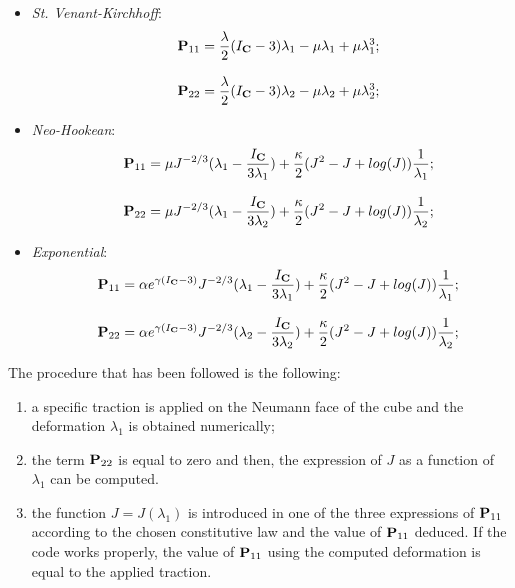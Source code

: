\begin{itemize}
\item \textit{St. Venant-Kirchhoff}:
  \begin{equation}
    \begin{array}{lll} & \textbf{P}_{11}=\displaystyle
      \frac{\lambda}{2}(I_{\textbf{C}}-3)\lambda_1 - \mu\lambda_1 +
      \mu\lambda_1^3;\\ \\ & \textbf{P}_{22}=\displaystyle
      \frac{\lambda}{2}(I_{\textbf{C}}-3)\lambda_2 - \mu\lambda_2 + \mu\lambda_2^3;
    \end{array}
    \label{eq::P11SVK}
  \end{equation}
\item \textit{Neo-Hookean}:
  \begin{equation}
    \begin{array}{lll} & \textbf{P}_{11}=\displaystyle \mu J^{-2/3}
      (\lambda_1 - \frac{I_{\textbf{C}}}{3\lambda_1}) + \frac{\kappa}{2}(J^2 - J +
      log(J))\frac{1}{\lambda_1};\\ \\ & \textbf{P}_{22}=\displaystyle \mu
      J^{-2/3} (\lambda_1 - \frac{I_{\textbf{C}}}{3\lambda_2}) +
      \frac{\kappa}{2}(J^2 - J + log(J))\frac{1}{\lambda_2};
    \end{array}
    \label{eq::P11NH}
  \end{equation}
\item \textit{Exponential}:
  \begin{equation}
    \begin{array}{lll} & \textbf{P}_{11}=\displaystyle \alpha e^{\gamma\left(I_{\textbf{C}}-3\right)}
      J^{-2/3}(\lambda_1 - \frac{I_{\textbf{C}}}{3\lambda_1})+\frac{\kappa}{2}(J^2 -
      J + log(J))\frac{1}{\lambda_1};\\ \\ & \textbf{P}_{22}=\displaystyle
      \alpha e^{\gamma\left(I_{\textbf{C}}-3\right)} J^{-2/3}(\lambda_2 -
      \frac{I_{\textbf{C}}}{3\lambda_2})+\frac{\kappa}{2}(J^2 - J +
      log(J))\frac{1}{\lambda_2};
    \end{array}
    \label{eq::P11EXP}
  \end{equation}
\end{itemize}
The procedure that has been followed is the following:
\begin{enumerate}
\item a specific traction is applied on the Neumann face of the cube
  and the deformation $\lambda_1$ is obtained numerically;
\item the term $\textbf{P}_{22}$ is equal to zero and then, the
  expression of $J$ as a function of $\lambda_1$ can be computed.
\item the function $J=J(\lambda_1)$ is introduced in one of the
  three expressions of $\textbf{P}_{11}$ according to the chosen
  constitutive law and the value of $\textbf{P}_{11}$ deduced. If the code
  works properly, the value of $\textbf{P}_{11}$ using the computed
  deformation is equal to the applied traction.
\end{enumerate}
